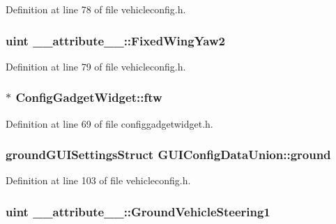 \-Definition at line 78 of file vehicleconfig.\-h.

\hypertarget{group___config_plugin_ga0f87bb28c2fe43ab7616b7322ac21106}{
\subsubsection[{\-Fixed\-Wing\-Yaw2}]{\setlength{\rightskip}{0pt plus 5cm}uint {\bf \-\_\-\-\_\-attribute\-\_\-\-\_\-\-::\-Fixed\-Wing\-Yaw2}}}\label{group___config_plugin_ga0f87bb28c2fe43ab7616b7322ac21106}


\-Definition at line 79 of file vehicleconfig.\-h.

\hypertarget{group___config_plugin_ga86b1da74559f7e5f1e68bf0360b06dc5}{
\subsubsection[{ftw}]{$\ast$ {\bf \-Config\-Gadget\-Widget\-::ftw}}}\label{group___config_plugin_ga86b1da74559f7e5f1e68bf0360b06dc5}


\-Definition at line 69 of file configgadgetwidget.\-h.

\hypertarget{group___config_plugin_ga27dfb53cf12c8f8bb3a869bdfa8c11cf}{
\subsubsection[{ground}]{\setlength{\rightskip}{0pt plus 5cm}ground\-G\-U\-I\-Settings\-Struct {\bf \-G\-U\-I\-Config\-Data\-Union\-::ground}}}\label{group___config_plugin_ga27dfb53cf12c8f8bb3a869bdfa8c11cf}


\-Definition at line 103 of file vehicleconfig.\-h.

\hypertarget{group___config_plugin_gad4fe3d4d30764b30210253be62bb0974}{
\subsubsection[{\-Ground\-Vehicle\-Steering1}]{\setlength{\rightskip}{0pt plus 5cm}uint {\bf \-\_\-\-\_\-attribute\-\_\-\-\_\-\-::\-Ground\-Vehicle\-Steering1}}}\label{group___config_plugin_gad4fe3d4d30764b30210253be62bb0974}


